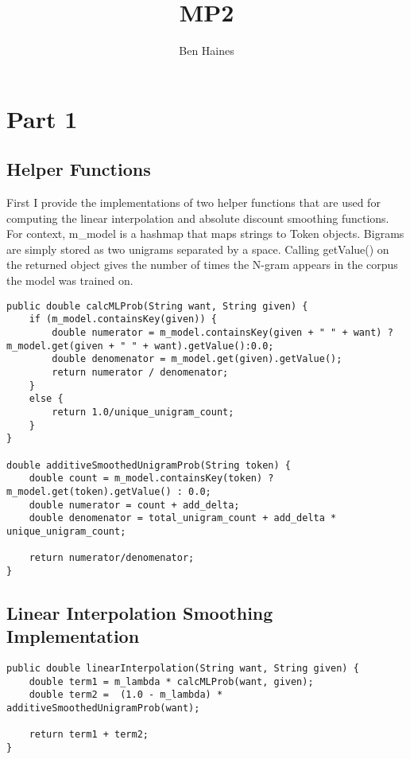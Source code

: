 \documentclass[paper=a4, fontsize=11pt]{jhwhw} %
\begin{document}
\title{MP2}
\author{Ben Haines}

\section{Part 1}
\subsection{Helper Functions}
First I provide the implementations of two helper functions that are used for computing the linear interpolation
and absolute discount smoothing functions. For context, m\_model is a hashmap that maps strings to Token objects. 
Bigrams are simply stored as two unigrams separated by a space. Calling getValue() on the returned object gives
the number of times the N-gram appears in the corpus the model was trained on.
\begin{lstlisting}
public double calcMLProb(String want, String given) {
    if (m_model.containsKey(given)) {
        double numerator = m_model.containsKey(given + " " + want) ? m_model.get(given + " " + want).getValue():0.0;
        double denomenator = m_model.get(given).getValue();
        return numerator / denomenator;
    }
    else {
        return 1.0/unique_unigram_count;
    }
}

double additiveSmoothedUnigramProb(String token) {
    double count = m_model.containsKey(token) ? m_model.get(token).getValue() : 0.0;
    double numerator = count + add_delta;
    double denomenator = total_unigram_count + add_delta * unique_unigram_count;

    return numerator/denomenator;
}
\end{lstlisting}
\subsection{Linear Interpolation Smoothing Implementation}
\begin{lstlisting}
public double linearInterpolation(String want, String given) {
    double term1 = m_lambda * calcMLProb(want, given);
    double term2 =  (1.0 - m_lambda) * additiveSmoothedUnigramProb(want);

    return term1 + term2;
}
\end{lstlisting}
\end{document}
